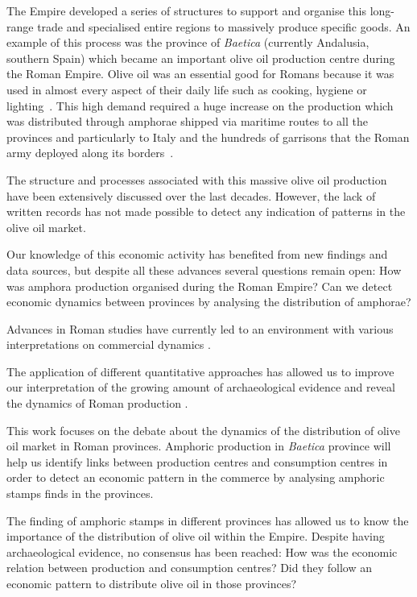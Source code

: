 The Empire developed a series of structures to support and organise this long-range trade and specialised entire regions to massively produce specific goods. An example of this process was the province of \textit{Baetica} (currently Andalusia, southern Spain) which became an important olive oil production centre during the Roman Empire. Olive oil was an essential good for Romans because it was used in almost every aspect of their daily life such as cooking, hygiene or lighting~\citep{mattingly_d.j._oil_1988}. This high demand required a huge increase on the production which was distributed through amphorae shipped via maritime routes to all the provinces and particularly to Italy and the hundreds of garrisons that the Roman army deployed along its borders~\citep{blazquez_exportacion_1980}. 

The structure and processes associated with this massive olive oil production have been extensively discussed over the last decades\citep{rodriguez_economioleicola_1977, Chic_hispania_1997,millet_anforas_1998}. 
However, the lack of written records has not made possible to detect any indication of patterns in the olive oil market.

Our knowledge of this economic activity has benefited from new findings and data sources, but despite all these advances several questions remain open: How was amphora production organised during the Roman Empire? Can we detect economic dynamics between provinces by analysing the distribution of amphorae?

Advances in Roman studies have currently led to an environment with various interpretations on commercial dynamics \citep{duncan1982economy,
temin_economy_2006,
quantifyingwilson2009}.

The application of different quantitative approaches has allowed us to improve our interpretation of the growing amount of archaeological evidence and reveal the dynamics of Roman production
\citep{brughmans_roman_2016,
orengo_seeds_2016,bayesian_2018,
coto-sarmiento_identifying_2018,
rubio-campillo_ecology_2018}.

This work focuses on the debate about the dynamics of the distribution of olive oil market in Roman provinces. Amphoric production in \textit{Baetica} province will help us identify links between production centres and consumption centres in order to detect an economic pattern in the commerce by analysing amphoric stamps finds in the provinces. 

The finding of amphoric stamps in different provinces has allowed us to know the importance of the distribution of olive oil within the Empire. Despite having archaeological evidence, no consensus has been reached: How was the economic relation between production and consumption centres? Did they follow an economic pattern to distribute olive oil in those provinces?
  
